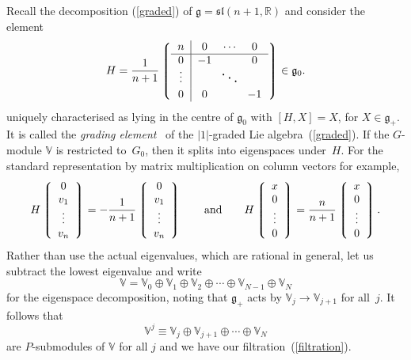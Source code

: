\documentclass[pdftex]{sigma}
\begin{document}
Recall the decomposition (\ref{graded}) of
${\mathfrak{g}}={\mathfrak{sl}}(n+1,{\mathbb{R}})$ and consider the element
\[H=\frac{1}{n+1}
\left\lgroup\begin{tabular}{c|ccc}$n$&$0$&$\!\cdots\!$&$0$\\ \hline
$0$&$-1$&&$0$\\
\raisebox{2pt}[15pt]{$\vdots$}&&
\raisebox{1pt}[0pt][0pt]{\makebox[0pt]{\Large$\ddots$}}\\
$0$&$0$&&$-1$\end{tabular}\right\rgroup\in{\mathfrak{g}}_0.\]
uniquely characterised as lying in the centre of ${\mathfrak{g}}_0$ with
$[H,X]=X$, for $X\in{\mathfrak{g}}_+$. It is called the {\em grading
element\/}~\cite{thebook} of the $|1|$-graded Lie algebra~(\ref{graded}). If
the $G$-module ${\mathbb{V}}$ is restricted to~$G_0$, then it splits into
eigenspaces under~$H$. For the standard representation by matrix multiplication
on column vectors for example,
\begin{equation}\label{Hstandard}
H\left\lgroup\begin{array}{c}0\\ v_1\\ \vdots\\ v_n\end{array}\right\rgroup=
-\frac{1}{n+1}
\left\lgroup\begin{array}{c}0\\ v_1\\ \vdots\\ v_n\end{array}\right\rgroup
\qquad\mbox{and}\qquad
H\left\lgroup\begin{array}{c}x\\ 0\\ \vdots\\ 0\end{array}\right\rgroup=
\frac{n}{n+1}
\left\lgroup\begin{array}{c}x\\ 0\\ \vdots\\ 0\end{array}\right\rgroup.
\end{equation}
Rather than use the actual eigenvalues, which are rational in general, let us
subtract the lowest eigenvalue and write
\begin{equation}\label{splits}
{\mathbb{V}}={\mathbb{V}}_0\oplus{\mathbb{V}}_1\oplus{\mathbb{V}}_2
\oplus\cdots\oplus{\mathbb{V}}_{N-1}\oplus{\mathbb{V}}_N\end{equation}
for the eigenspace decomposition, noting that ${\mathfrak{g}}_+$ acts by
${\mathbb{V}}_j\to{\mathbb{V}}_{j+1}$ for all~$j$. It follows that
\begin{equation}\label{submodules}
{\mathbb{V}}^j\equiv{\mathbb{V}}_j\oplus{\mathbb{V}}_{j+1}\oplus\cdots\oplus
{\mathbb{V}}_N\end{equation}
are $P$-submodules of ${\mathbb{V}}$ for all $j$ and we have our
f\/iltration~(\ref{filtration}).
\end{document}
